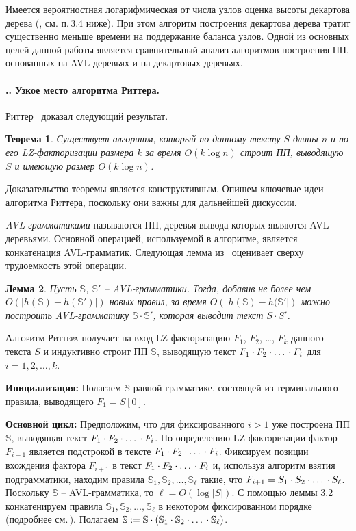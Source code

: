 ﻿\documentclass[11pt]{article}
\newtheorem{thm}{Теорема}[section]
\newtheorem{lem}[thm]{Лемма}
\theoremstyle{remark}
\newcommand{\subsectionnew}[1]{
    \addtocounter{subsection}{1}
    \paragraph*{\arabic{section}.\arabic{subsection}. #1}
}
\newcommand{\header}[1]{
    \noindent \textsc{#1}
}
\newcommand{\slp}[1]{\mathbb{#1}}
\newcommand{\tuple}[4]{
    #1_{#2}, #1_{#3}, \dots, #1_{#4}
}
\newcommand{\concat}[4]{
    #1_{#2} \cdot #1_{#3} \cdot \mbox{\dots} \cdot #1_{#4}
}
\begin{document}
Имеется вероятностная логарифмическая от числа узлов оценка высоты декартова дерева (\!\!\cite{Seidel&Aragon:1996}, см. п.\,3.4 ниже). При
этом алгоритм построения декартова дерева тратит существенно меньше времени на поддержание баланса узлов. Одной из основных целей данной
работы является сравнительный анализ алгоритмов построения ПП, основанных на AVL-деревьях и на декартовых деревьях.

\subsectionnew{Узкое место алгоритма Риттера.} Риттер~\cite{SLPConstruction} доказал следующий результат.

\begin{thm}
\label{thm:rytter}
Существует алгоритм, который по данному тексту $S$ длины $n$ и по его LZ-факторизации размера $k$ за время $O(k\log n)$
строит ПП, выводящую $S$ и имеющую размер $O(k\log n)$.
\end{thm}

Доказательство теоремы является конструктивным. Опишем ключевые идеи алгоритма Риттера, поскольку они важны для
дальнейшей дискуссии.

\emph{AVL-грамматиками} называются ПП, деревья вывода которых являются AVL-деревьями. Основной операцией, используемой
в алгоритме, является конкатенация AVL-грам\-ма\-тик. Следующая лемма из~\cite{SLPConstruction} оценивает сверху
трудоемкость этой операции.

\begin{lem}
\label{avl-lemma} Пусть $\slp{S}$, $\slp{S}'$ -- AVL-грамматики. Тогда, добавив не более чем $O\left(|h(\slp{S})-h(\slp{S}')|\right)$ новых
правил, за время $O\left(|h(\slp{S})-h(\slp{S}'|\right)$ можно построить AVL-грамматику $\slp{S}\cdot\slp{S}'$, которая выводит текст
$S\cdot S'$.
\end{lem}

\medskip

\header{Алгоритм Риттера} получает на вход LZ-факторизацию $F_1$, $F_2$, \dots, $F_k$ данного текста $S$ и индуктивно строит ПП $\slp{S}$,
выводящую текст $\concat{F}{1}{2}{i}$ для $i=1,2,\dots,k$.

\smallskip

\noindent\textbf{Инициализация:} Полагаем $\slp{S}$ равной грамматике, состоящей из терминального правила, выводящего $F_1=S[0]$.

\smallskip

\noindent\textbf{Основной цикл:} Предположим, что для фиксированного $i > 1$ уже построена ПП $\slp{S}$, выводящая текст
$\concat{F}{1}{2}{i}$. По определению  LZ-факторизации фактор $F_{i+1}$ является подстрокой в тексте $\concat{F}{1}{2}{i}$. Фиксируем
позиции вхождения фактора $F_{i+1}$ в текст $\concat{F}{1}{2}{i}$ и, используя алгоритм взятия подграмматики, находим правила
$\tuple{\slp{S}}{1}{2}{\ell}$ такие, что $F_{i+1} = \concat{S}{1}{2}{\ell}$. Поскольку $\slp{S}$ -- AVL-грамматика, то $\ell = O(\log
|S|)$. С помощью леммы 3.2 конкатенируем правила $\tuple{\slp{S}}{1}{2}{\ell}$ в некотором фиксированном порядке (подробнее
см.\,\cite{SLPConstruction}). Полагаем $\slp{S}:=\slp{S}\cdot(\concat{\slp{S}}{1}{2}{\ell})$.
\end{document}

